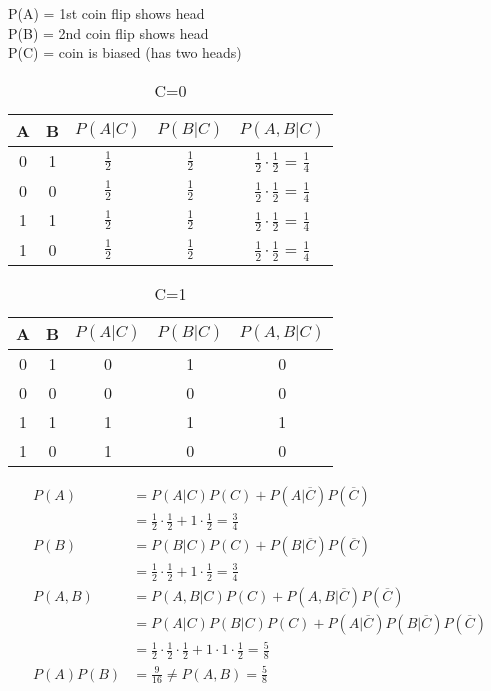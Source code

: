 \documentclass{article}
\begin{document}
\noindent P(A) = 1st coin flip shows head\\
P(B) = 2nd coin flip shows head\\
P(C) = coin is biased (has two heads)

\begin{table}[htb]
\caption{C=0}
\centering
  \begin{tabular}{ | c | c | c| c | c|}
    \hline
    A & B & $P(A|C)$ & $P(B|C)$ & $P(A,B|C)$ \\ \hline
    0 & 1 & $\frac{1}{2}$ & $\frac{1}{2}$ & $\frac{1}{2}\cdot\frac{1}{2}$ = $\frac{1}{4}$ \\ \hline 
    0 & 0 & $\frac{1}{2}$ & $\frac{1}{2}$ & $\frac{1}{2}\cdot \frac{1}{2}$ = $\frac{1}{4}$ \\ \hline
    1 & 1 & $\frac{1}{2}$ & $\frac{1}{2}$ & $\frac{1}{2}\cdot\frac{1}{2}$ = $\frac{1}{4}$ \\ \hline
    1 & 0 & $\frac{1}{2}$ & $\frac{1}{2}$ & $\frac{1}{2}\cdot\frac{1}{2}$ = $\frac{1}{4}$ \\  \hline
  \end{tabular}
  \end{table}

\begin{table}[htb]
\caption{C=1}
\centering
  \begin{tabular}{ | c | c | c| c | c|}
    \hline
    A & B & $P(A|C)$ & $P(B|C)$ & $P(A,B|C)$ \\ \hline
    0 & 1 &0 &1 & 0 \\ \hline 
    0 & 0 &0 & 0 & 0 \\ \hline
    1 & 1 & 1 & 1 & 1 \\ \hline
    1 & 0 & 1 & 0 & 0 \\  \hline
  \end{tabular}
  \end{table}

\begin{align*}
P(A) &= P(A|C)P(C)+P(A|\overline{C})P(\overline{C}) \\&= \frac{1}{2}\cdot\frac{1}{2} + 1\cdot\frac{1}{2}=\frac{3}{4}\\
P(B) &= P(B|C)P(C)+P(B|\overline{C})P(\overline{C}) \\&= \frac{1}{2}\cdot\frac{1}{2} + 1\cdot\frac{1}{2}=\frac{3}{4}\\
P(A,B) &= P(A, B|C)P(C)+P(A, B|\overline{C})P(\overline{C}) \\&= P(A|C)P(B|C)P(C)+P(A|\overline{C})P(B|\overline{C})P(\overline{C})\\& = \frac{1}{2}\cdot \frac{1}{2}\cdot \frac{1}{2}  + 1\cdot 1\cdot \frac{1}{2}= \frac{5}{8}
\\
P(A)P(B) &= \frac{9}{16} \neq P(A,B) = \frac{5}{8}
\end{align*}
\end{document}
